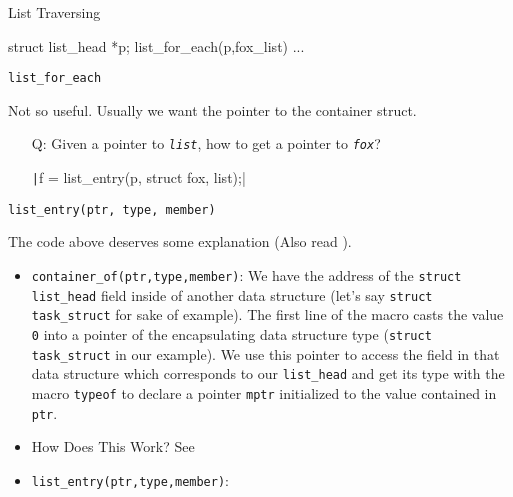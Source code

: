 \begin{frame}[fragile=singleslide]{List Traversing}
  \begin{center}
\begin{ccode}
struct list_head *p;
list_for_each(p,fox_list){ ... }
\end{ccode}
  \end{center}
  \begin{block}{\texttt{list\_for\_each}}
    \begin{center}
    \end{center}
  \end{block}
  Not so useful. Usually we want the pointer to the container struct.
\end{frame}

\begin{frame}[fragile=singleslide]
  \begin{center}
  \end{center}
  \begin{itemize}
  \item[Q:] Given a pointer to \emph{\texttt{list}}, how to get a pointer to \emph{\texttt{fox}}?
    \begin{center}
      \texttt|f = list_entry(p, struct fox, list);|
    \end{center}
  \end{itemize}
  \begin{block}{\texttt{list\_entry(ptr, type, member)}}
    \begin{center}
    \end{center}
  \end{block}
\end{frame}

The code above deserves some explanation (Also read ).

\begin{itemize}
\item \texttt{container_of(ptr,type,member)}: We have the address of the
  \texttt{struct list_head} field inside of another data structure (let's say
  \texttt{struct task_struct} for sake of example). The first line of the macro
  casts the value \texttt{0} into a pointer of the encapsulating data structure type
  (\texttt{struct task_struct} in our example). We use this pointer to access the
  field in that data structure which corresponds to our \verb|list_head| and get
  its type with the macro \texttt{typeof} to declare a pointer \texttt{mptr} initialized
  to the value contained in \texttt{ptr}. 
\item How Does This Work? See 
\item \texttt{list_entry(ptr,type,member)}: 
\end{itemize}

